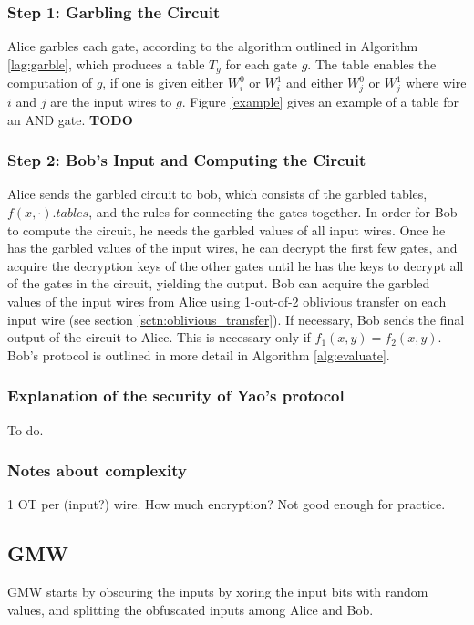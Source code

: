 \documentclass[12pt,twoside]{reedthesis}
\begin{document}
\subsubsection{Step 1: Garbling the Circuit}
Alice garbles each gate, according to the algorithm outlined in Algorithm \ref{lag:garble}, which produces a table $T_g$ for each gate $g$.
The table enables the computation of $g$, if one is given either $W^0_i$ or $W^1_i$ and either $W^0_j$ or $W^1_j$ where wire $i$ and $j$ are the input wires to $g$.
Figure \ref{example} gives an example of a table for an AND gate. \textbf{TODO}

\subsubsection{Step 2: Bob's Input and Computing the Circuit}
Alice sends the garbled circuit to bob, which consists of the garbled tables, $f(x,\cdot).tables$, and the rules for connecting the gates together.
In order for Bob to compute the circuit, he needs the garbled values of all input wires.
Once he has the garbled values of the input wires, he can decrypt the first few gates, and acquire the decryption keys of the other gates until he has the keys to decrypt all of the gates in the circuit, yielding the output.
Bob can acquire the garbled values of the input wires from Alice using 1-out-of-2 oblivious transfer on each input wire (see section \ref{sctn:oblivious_transfer}).
If necessary, Bob sends the final output of the circuit to Alice. 
This is necessary only if $f_1(x,y) = f_2(x,y)$. 
Bob's protocol is outlined in more detail in Algorithm \ref{alg:evaluate}.

\subsubsection{Explanation of the security of Yao's protocol}
To do.

\subsubsection{Notes about complexity}
1 OT per (input?) wire.
How much encryption?
Not good enough for practice.

\subsection{GMW}
GMW starts by obscuring the inputs by xoring the input bits with random values, and splitting the obfuscated inputs among Alice and Bob.
\end{document}
